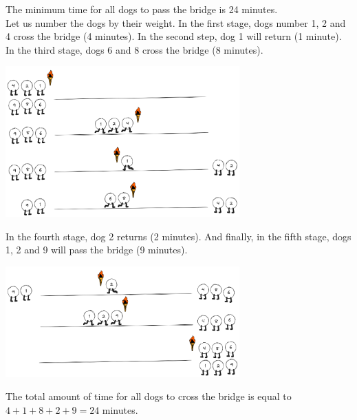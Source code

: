 \begin{solution}
The minimum time  for all dogs to pass the bridge is 24 minutes.\\[0.2cm]

Let us number the dogs by their weight. In the first stage, dogs number 1, 2 and 4 cross the bridge (4 minutes). In the second step, dog 1 will return (1 minute). In the third stage, dogs 6 and 8 cross the bridge (8 minutes).
\begin{center}
	\includegraphics[width=9cm]{40/figs/40_diagram0.png}
\end{center}

In the fourth stage, dog 2 returns (2 minutes). And finally, in the fifth stage, dogs 1, 2 and 9 will pass the bridge (9 minutes).

\begin{center}
	\includegraphics[width=9cm]{40/figs/40_diagram1.png}
\end{center}

The total amount of time for all dogs to cross the bridge is equal to $4+1+8+2+9 = 24$ minutes.
\end{solution}